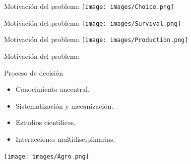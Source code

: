 \documentclass[aspectratio=169]{beamer}
\begin{document}
\begin{frame}{Motivación del problema}
	\vspace{-1.5cm} \centering
	\texttt{[image: images/Choice.png]}
\end{frame}

\begin{frame}{Motivación del problema}
	\vspace{-1cm}\centering
	\texttt{[image: images/Survival.png]}
\end{frame}

\begin{frame}{Motivación del problema}
	 \vspace{-1cm}
	 \centering
	\texttt{[image: images/Production.png]}
\end{frame}


\begin{frame}{Motivación del problema}
\begin{block}{\centering Proceso de decisión}
	\begin{minipage}{0.5\textwidth}
		\pause\begin{itemize}
			\item Conocimiento ancentral.
			\item Sistematización y mecanización.
			\item Estudios científicos.
			\item Interacciones multidisciplinarias.
		\end{itemize}
	\end{minipage}%
	\begin{minipage}{0.5\textwidth}
			 \phantom{text}
			\phantom{text}
			\phantom{text}
			\phantom{text}
	\end{minipage}
\end{block}
\centering\texttt{[image: images/Agro.png]}
\end{frame}
\end{document}

